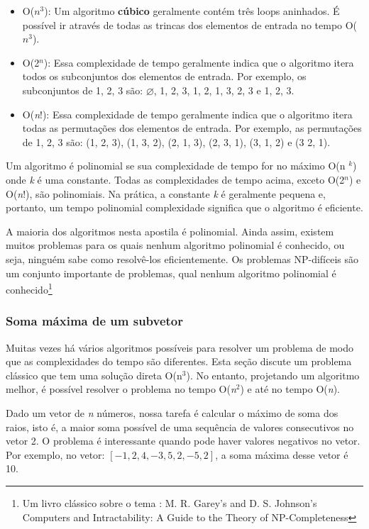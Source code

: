 \begin{itemize}
    \item O($n^3$): Um algoritmo \textbf{cúbico} geralmente contém três loops aninhados. É possível ir através de todas as trincas dos elementos de entrada no tempo O($n^3$).

    \item O(2$^n$): Essa complexidade de tempo geralmente indica que o algoritmo itera todos os subconjuntos dos elementos de entrada. Por exemplo, os subconjuntos de {1, 2, 3} são: $\varnothing$, {1}, {2}, {3}, {1, 2}, {1, 3}, {2, 3} e {1, 2, 3}.

    \item O(\textit{n}!): Essa complexidade de tempo geralmente indica que o algoritmo itera todas as permutações dos elementos de entrada. Por exemplo, as permutações de {1, 2, 3} são: (1, 2, 3), (1, 3, 2), (2, 1, 3), (2, 3, 1), (3, 1, 2) e (3 2, 1).

\end{itemize}

Um algoritmo é polinomial se sua complexidade de tempo for no máximo O(n $^k$) onde \textit{k} é uma constante. Todas as complexidades de tempo acima, exceto O(2$^n$) e O(\textit{n}!), são polinomiais. Na prática, a constante \textit{k} é geralmente pequena e, portanto, um tempo polinomial complexidade significa que o algoritmo é eficiente. 

A maioria dos algoritmos nesta apostila é polinomial. Ainda assim, existem muitos problemas para os quais nenhum algoritmo polinomial é conhecido, ou seja, ninguém sabe como resolvê-los eficientemente. Os problemas NP-difíceis são um conjunto importante de problemas, qual nenhum algoritmo polinomial é conhecido\footnote{Um livro clássico sobre o tema : M. R. Garey’s and D. S. Johnson’s Computers and Intractability:
A Guide to the Theory of NP-Completeness}


\subsubsection{Soma máxima de um subvetor}
    
Muitas vezes há vários algoritmos possíveis para resolver um problema de modo que as complexidades do tempo são diferentes. Esta seção discute um problema clássico que tem uma solução direta O(n$^3$). No entanto, projetando um algoritmo melhor, é possível resolver o problema no tempo O(\textit{n}$^2$) e até no tempo O(\textit{n}).    

Dado um vetor de \textit{n} números, nossa tarefa é calcular o máximo de soma dos raios, isto é, a maior soma possível de uma sequência de valores consecutivos no vetor 2. O problema é interessante quando pode haver valores negativos no
vetor. Por exemplo, no vetor:  $[-1, 2, 4, -3, 5, 2, -5, 2]$, a soma máxima desse vetor é 10.


